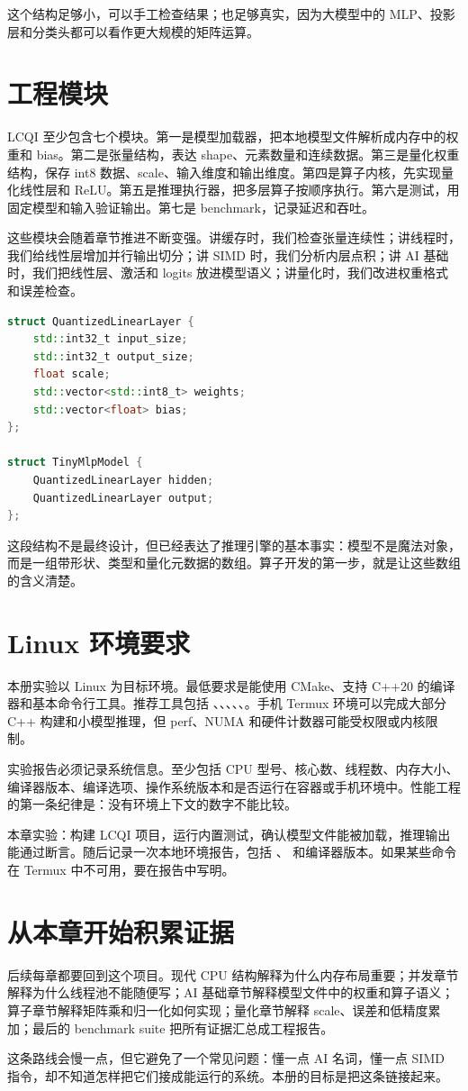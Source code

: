 这个结构足够小，可以手工检查结果；也足够真实，因为大模型中的 MLP、投影层和分类头都可以看作更大规模的矩阵运算。

\section{工程模块}

LCQI 至少包含七个模块。第一是模型加载器，把本地模型文件解析成内存中的权重和 bias。第二是张量结构，表达 shape、元素数量和连续数据。第三是量化权重结构，保存 int8 数据、scale、输入维度和输出维度。第四是算子内核，先实现量化线性层和 ReLU。第五是推理执行器，把多层算子按顺序执行。第六是测试，用固定模型和输入验证输出。第七是 benchmark，记录延迟和吞吐。

这些模块会随着章节推进不断变强。讲缓存时，我们检查张量连续性；讲线程时，我们给线性层增加并行输出切分；讲 SIMD 时，我们分析内层点积；讲 AI 基础时，我们把线性层、激活和 logits 放进模型语义；讲量化时，我们改进权重格式和误差检查。

\begin{lstlisting}[language=C++,caption={推理引擎第一阶段的核心对象关系}]
struct QuantizedLinearLayer {
    std::int32_t input_size;
    std::int32_t output_size;
    float scale;
    std::vector<std::int8_t> weights;
    std::vector<float> bias;
};

struct TinyMlpModel {
    QuantizedLinearLayer hidden;
    QuantizedLinearLayer output;
};
\end{lstlisting}

这段结构不是最终设计，但已经表达了推理引擎的基本事实：模型不是魔法对象，而是一组带形状、类型和量化元数据的数组。算子开发的第一步，就是让这些数组的含义清楚。

\section{Linux 环境要求}

本册实验以 Linux 为目标环境。最低要求是能使用 CMake、支持 C++20 的编译器和基本命令行工具。推荐工具包括 、、、、、。手机 Termux 环境可以完成大部分 C++ 构建和小模型推理，但 perf、NUMA 和硬件计数器可能受权限或内核限制。

实验报告必须记录系统信息。至少包括 CPU 型号、核心数、线程数、内存大小、编译器版本、编译选项、操作系统版本和是否运行在容器或手机环境中。性能工程的第一条纪律是：没有环境上下文的数字不能比较。

\begin{labbox}
本章实验：构建 LCQI 项目，运行内置测试，确认模型文件能被加载，推理输出能通过断言。随后记录一次本地环境报告，包括 、 和编译器版本。如果某些命令在 Termux 中不可用，要在报告中写明。
\end{labbox}

\section{从本章开始积累证据}

后续每章都要回到这个项目。现代 CPU 结构解释为什么内存布局重要；并发章节解释为什么线程池不能随便写；AI 基础章节解释模型文件中的权重和算子语义；算子章节解释矩阵乘和归一化如何实现；量化章节解释 scale、误差和低精度累加；最后的 benchmark suite 把所有证据汇总成工程报告。

这条路线会慢一点，但它避免了一个常见问题：懂一点 AI 名词，懂一点 SIMD 指令，却不知道怎样把它们接成能运行的系统。本册的目标是把这条链接起来。
